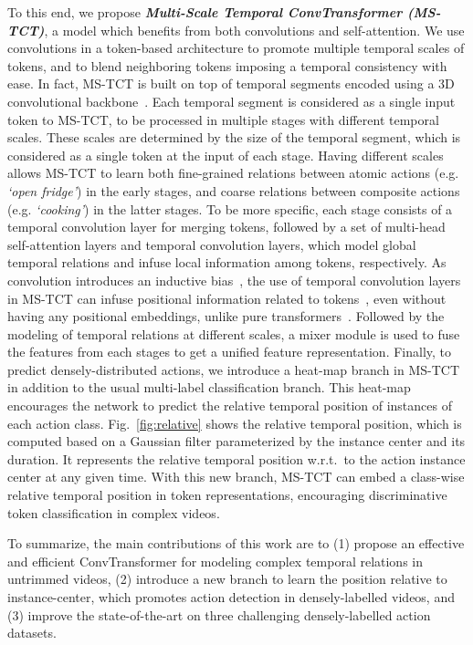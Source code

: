 \documentclass[10pt,twocolumn,letterpaper]{article}
\begin{document}
\noindent To this end, we propose \textit{\textbf{Multi-Scale Temporal ConvTransformer (MS-TCT)}}, a model which benefits from both convolutions and self-attention. We use convolutions in a token-based architecture to promote multiple temporal scales of tokens, and to blend neighboring tokens imposing a temporal consistency with ease.
In fact, MS-TCT is built on top of temporal segments encoded using a 3D convolutional backbone~\cite{i3d}. Each temporal segment is considered as a single input token to MS-TCT, to be processed in multiple stages with different temporal scales. These scales are determined by the size of the temporal segment, which is considered as a single token
at the input of each stage. Having different scales allows MS-TCT to learn both fine-grained relations between atomic actions (e.g. \textit{`open fridge'}) in the early stages, and coarse relations between composite actions (e.g. \textit{`cooking'}) in the latter stages. 
To be more specific, each stage consists of a temporal convolution layer for merging tokens, followed by a set of multi-head self-attention layers and temporal convolution layers, which model global temporal relations and infuse local information among tokens, respectively. 
As convolution introduces an inductive bias~\cite{d2021convit}, the use of temporal convolution layers in MS-TCT can infuse positional information related to tokens~\cite{guo2021cmt,islam2020much}, even without having any positional embeddings, unlike pure transformers~\cite{dosovitskiy2020image}. Followed by the modeling of temporal relations at different scales, a mixer module is used to fuse the features from each stages to get a unified feature representation. 
Finally, to predict densely-distributed actions, we introduce a heat-map branch in MS-TCT in addition to the usual multi-label classification branch. This heat-map encourages the network to predict the relative temporal position of instances of each action class. 
Fig.~\ref{fig:relative} shows the relative temporal position, which is computed based on a Gaussian filter parameterized by the instance center and its duration. 
It represents the relative temporal position w.r.t.~to the action instance center at any given time. 
With this new branch, MS-TCT can embed a class-wise relative temporal position in token representations, encouraging discriminative token classification in complex videos. 





To summarize, the main contributions of this work are to
(1) propose an effective and efficient ConvTransformer for modeling complex temporal relations in untrimmed videos, (2) introduce a new branch to learn the position relative to instance-center, which promotes action detection in densely-labelled videos, and (3) improve the state-of-the-art on three challenging densely-labelled action datasets. 
\end{document}
